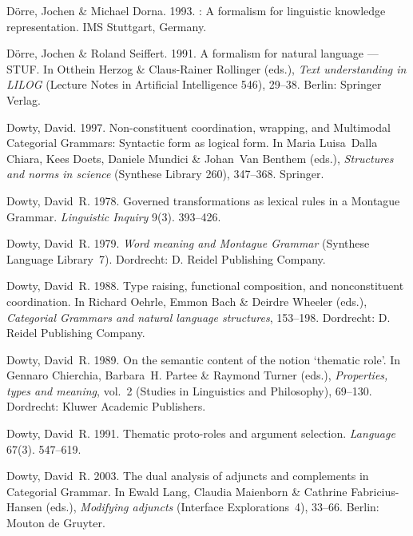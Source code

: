 \begin{thebibliography}{1420}
D{\"o}rre, Jochen \& Michael Dorna. 1993.
: {A} formalism for linguistic knowledge representation.
 IMS Stuttgart, Germany.

D{\"o}rre, Jochen \& Roland Seiffert. 1991.
\newblock A formalism for natural language --- {STUF}.
\newblock In Otthein Herzog \& Claus-Rainer Rollinger (eds.), \emph{Text
  understanding in {LILOG}} (Lecture Notes in Artificial Intelligence 546),
  29--38. Berlin: Springer Verlag.

Dowty, David. 1997.
\newblock Non-constituent coordination, wrapping, and {Multimodal Categorial
  Grammars}: {Syntactic} form as logical form.
\newblock In Maria Luisa~Dalla Chiara, Kees Doets, Daniele Mundici \& Johan~Van
  Benthem (eds.), \emph{Structures and norms in science} (Synthese Library
  260), 347--368. Springer.

Dowty, David~R. 1978.
\newblock Governed transformations as lexical rules in a {Montague Grammar}.
\newblock \emph{Linguistic Inquiry} 9(3). 393--426.

Dowty, David~R. 1979.
\newblock \emph{Word meaning and {Montague Grammar}} (Synthese Language
  Library~7).
\newblock Dordrecht: D. Reidel Publishing Company.

Dowty, David~R. 1988.
\newblock Type raising, functional composition, and nonconstituent
  coordination.
\newblock In Richard Oehrle, Emmon Bach \& Deirdre Wheeler (eds.),
  \emph{{Categorial Grammars} and natural language structures}, 153--198.
  Dordrecht: D. Reidel Publishing Company.

Dowty, David~R. 1989.
\newblock On the semantic content of the notion `thematic role'.
\newblock In Gennaro Chierchia, Barbara~H. Partee \& Raymond Turner (eds.),
  \emph{Properties, types and meaning}, vol.~2  (Studies in Linguistics and
  Philosophy), 69--130. Dordrecht: Kluwer Academic Publishers.

Dowty, David~R. 1991.
\newblock Thematic proto-roles and argument selection.
\newblock \emph{Language} 67(3). 547--619.

Dowty, David~R. 2003.
\newblock The dual analysis of adjuncts and complements in {Categorial
  Grammar}.
\newblock In Ewald Lang, Claudia Maienborn \& Cathrine Fabricius-Hansen (eds.),
  \emph{Modifying adjuncts} (Interface Explorations~4), 33--66. Berlin: Mouton
  de Gruyter.


\end{thebibliography}
